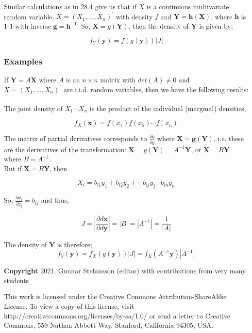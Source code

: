 \documentclass[12pt,a4paper]{article}
\theoremstyle{regla}
\theoremstyle{remark}
\theoremstyle{definition}
\theoremstyle{nonumberbreak}
\begin{document}
Similar calculations as in 28.4 give us that if $X$ is a continuous multivariate random variable, $X = (X_1, \ldots, X_n)^\prime$ with density $f$ and $\mathbf{Y}  = \mathbf{h} (\mathbf{X})$, where $\mathbf{h}$ is 1-1 with inverse $ \mathbf g= \mathbf{h}^{-1}$. So, $\mathbf{X} = g(\mathbf{Y})$, then the density of $\mathbf{Y}$ is given by;

$$f_Y(\mathbf y)   = f (g(\mathbf y)) |J|$$


\subsubsection{Examples}
\begin{xmpl}

If $\mathbf{Y} = A \mathbf X$ where $A$ is an $n \times n$ matrix with $det(A)\neq0$ and $X = (X_1, \ldots, X_n)^\prime $ are i.i.d. random variables, then we have the following results:\\\\

The joint density of $ X_1 \cdots X_n$ is the product of the individual (marginal) densities,

$$f_X(\mathbf x)= f(x_1) f(x_2) \cdots f(x_n)$$

The matrix of partial derivatives corresponds to  $\frac{\partial g}{\partial y}$ where $\mathbf X = \mathbf g(\mathbf{Y})$, i.e. these are the derivatives of the transformation: $\mathbf X = g (\mathbf{Y}) = A^{-1}\mathbf{Y}$, or $\mathbf X = B \mathbf{Y}$ where $B = A^{-1}$.\\
 
But if $\mathbf X = B \mathbf{Y}$, then
 
$$X_i = b_{i1}y_1 + b_{i2}y_2 + \cdots b_{ij}y_j\cdots b_{in}y_n$$

So, $ \frac{\partial x_i}{\partial y_j} = b_{ij}$ and thus,
 
 $$ J =\left|\frac{\partial d\mathbf x}{\partial d\mathbf y}\right| = |B| = |A^{-1}| = \frac {1}{|A|}$$
 
 The density of $\mathbf{Y}$ is therefore;
 $$f_Y(\mathbf{y})   =  f_X(g(\mathbf{y})) |J| = f_X(A^{-1}\mathbf{y}) |A^{-1}|$$
 
 \end{xmpl}



{\bf Copyright}
2021, Gunnar Stefansson (editor) with contributions from very many students

This work is licensed under the Creative Commons
Attribution-ShareAlike License. To view a copy of this license, visit
http://creativecommons.org/licenses/by-sa/1.0/ or send a letter to
Creative Commons, 559 Nathan Abbott Way, Stanford, California 94305,
USA.
\clearpage
\end{document}
